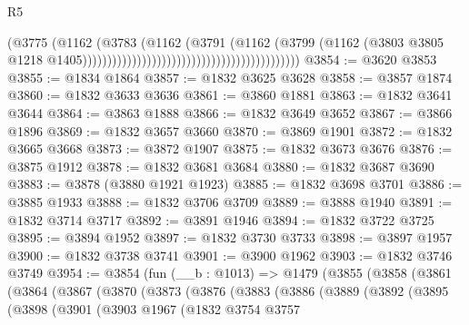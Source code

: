 \begin{lexlean}{R5}
\begin{coremodule}
                                                                          (@3775
                                                                            (@1162
                                                                              (@3783
                                                                                (@1162
                                                                                  (@3791
                                                                                    (@1162
                                                                                      (@3799
                                                                                        (@1162
                                                                                          (@3803
                                                                                            @3805
                                                                                            @1218
                                                                                            @1405))))))))))))))))))))))))))))))))))))))))))))
@3854 := @3620 @3853
@3855 := @1834 @1864
@3857 := @1832 @3625 @3628
@3858 := @3857 @1874
@3860 := @1832 @3633 @3636
@3861 := @3860 @1881
@3863 := @1832 @3641 @3644
@3864 := @3863 @1888
@3866 := @1832 @3649 @3652
@3867 := @3866 @1896
@3869 := @1832 @3657 @3660
@3870 := @3869 @1901
@3872 := @1832 @3665 @3668
@3873 := @3872 @1907
@3875 := @1832 @3673 @3676
@3876 := @3875 @1912
@3878 := @1832 @3681 @3684
@3880 := @1832 @3687 @3690
@3883 := @3878 (@3880 @1921 @1923)
@3885 := @1832 @3698 @3701
@3886 := @3885 @1933
@3888 := @1832 @3706 @3709
@3889 := @3888 @1940
@3891 := @1832 @3714 @3717
@3892 := @3891 @1946
@3894 := @1832 @3722 @3725
@3895 := @3894 @1952
@3897 := @1832 @3730 @3733
@3898 := @3897 @1957
@3900 := @1832 @3738 @3741
@3901 := @3900 @1962
@3903 := @1832 @3746 @3749
@3954 := @3854
    (fun (__b : @1013) =>
    @1479
      (@3855
        (@3858
          (@3861
            (@3864
              (@3867
                (@3870
                  (@3873
                    (@3876
                      (@3883
                        (@3886
                          (@3889
                            (@3892
                              (@3895
                                (@3898
                                  (@3901
                                    (@3903
                                      @1967
                                      (@1832
                                        @3754
                                        @3757

\end{coremodule}
\end{lexlean}

